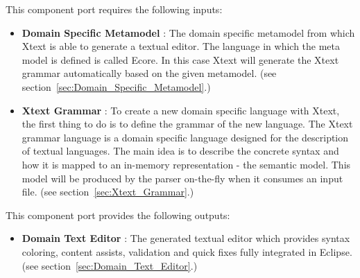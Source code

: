 \documentclass{gemoc} %
\begin{document}
This component port requires the following inputs:
\begin{itemize}
  \item \textbf{Domain Specific Metamodel} :
The domain specific metamodel from which Xtext is able to generate a textual editor. The language in which the meta model is defined is called Ecore. In this case Xtext will generate the Xtext grammar automatically based on the given metamodel.
(see section~\ref{sec:Domain_Specific_Metamodel}.)
  \item \textbf{Xtext Grammar} :
To create a new domain specific language with Xtext, the first thing to do is to define the grammar of the new language. The Xtext grammar language is a domain specific language designed for the description of textual languages. The main idea is to describe the concrete syntax and how it is mapped to an in-memory representation - the semantic model. This model will be produced by the parser on-the-fly when it consumes an input file.
(see section~\ref{sec:Xtext_Grammar}.)
\end{itemize}

This component port provides the following outputs:
\begin{itemize}
  \item \textbf{Domain Text Editor} :
The generated textual editor which provides syntax coloring, content assists, validation and quick fixes fully integrated in Eclipse.
(see section~\ref{sec:Domain_Text_Editor}.)
\end{itemize}
\end{document}
